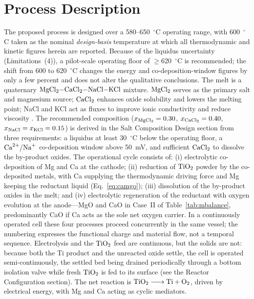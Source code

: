 \documentclass[11pt]{article}
\begin{document}
\newpage

\section*{Process Description}

The proposed process is designed over a 580--650~$^{\circ}$C operating range, with 600~$^{\circ}$C taken as the nominal \emph{design-basis} temperature at which all thermodynamic and kinetic figures herein are reported. Because of the liquidus uncertainty (Limitations~(4)), a pilot-scale operating floor of $\geq$620~$^{\circ}$C is recommended; the shift from 600 to 620~$^{\circ}$C changes the energy and co-deposition-window figures by only a few percent and does not alter the qualitative conclusions. The melt is a quaternary $\ce{MgCl2-CaCl2-NaCl-KCl}$ mixture. $\ce{MgCl2}$ serves as the primary salt and magnesium source; $\ce{CaCl2}$ enhances oxide solubility and lowers the melting point; NaCl and KCl act as fluxes to improve ionic conductivity and reduce viscosity \cite{sato1999}. The recommended composition ($x_{\ce{MgCl2}} = 0.30$, $x_{\ce{CaCl2}} = 0.40$, $x_{\ce{NaCl}} = x_{\ce{KCl}} = 0.15$) is derived in the Salt Composition Design section from three requirements: a liquidus at least 30~$^{\circ}$C below the operating floor, a $\ce{Ca^{2+}/Na+}$ co-deposition window above 50~mV, and sufficient $\ce{CaCl2}$ to dissolve the by-product oxides. The operational cycle consists of: (i) electrolytic co-deposition of Mg and Ca at the cathode; (ii) reduction of $\ce{TiO2}$ powder by the co-deposited metals, with Ca supplying the thermodynamic driving force and Mg keeping the reductant liquid (Eq.~\ref{eq:camgo}); (iii) dissolution of the by-product oxides in the melt; and (iv) electrolytic regeneration of the reductant with oxygen evolution at the anode---MgO and CaO in Case~II of Table~\ref{tab:mbalance}, predominantly CaO if Ca acts as the sole net oxygen carrier. In a continuously operated cell these four processes proceed concurrently in the same vessel; the numbering expresses the functional charge and material flow, not a temporal sequence. Electrolysis and the $\ce{TiO2}$ feed are continuous, but the solids are not: because both the Ti product and the unreacted oxide settle, the cell is operated semi-continuously, the settled bed being drained periodically through a bottom isolation valve while fresh $\ce{TiO2}$ is fed to its surface (see the Reactor Configuration section). The net reaction is $\ce{TiO2 -> Ti + O2}$, driven by electrical energy, with Mg and Ca acting as cyclic mediators.
\end{document}

